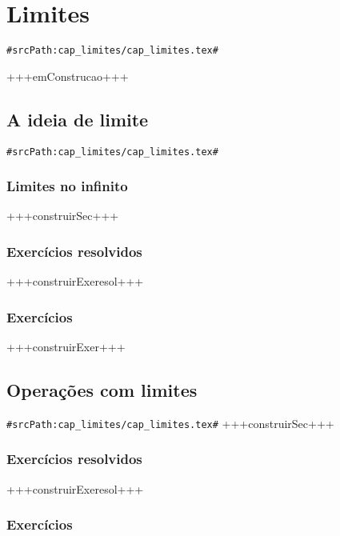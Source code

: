 
\chapter{Limites}
\verb+#srcPath:cap_limites/cap_limites.tex#+
\label{cap:limites}

+++emConstrucao+++

\section{A ideia de limite}
\verb+#srcPath:cap_limites/cap_limites.tex#+
\label{sec:limites_ideia}
\subsection {Limites no infinito}
+++construirSec+++

\subsection*{Exercícios resolvidos}

+++construirExeresol+++


\subsection*{Exercícios}

+++construirExer+++


\section{Operações com limites}
\verb+#srcPath:cap_limites/cap_limites.tex#+
\label{sec:limites_opera}
+++construirSec+++

\subsection*{Exercícios resolvidos}

+++construirExeresol+++


\subsection*{Exercícios}

